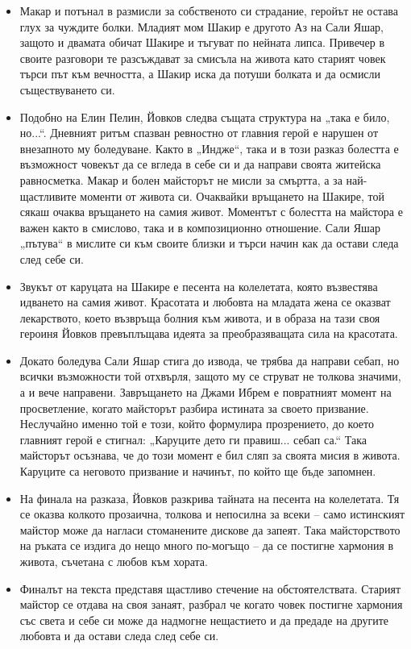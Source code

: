 \documentclass[12pt,a4paper]{article}
\begin{document}
\begin{itemize}[leftmargin=*, noitemsep, topsep=2pt, parsep=0pt]
    \vspace{0.1cm}
    \item Макар и потънал в размисли за собственото си страдание, геройът не остава глух за чуждите болки. Младият мом Шакир е другото Аз на Сали Яшар, защото и двамата обичат Шакире и тъгуват по нейната липса. Привечер в своите разговори те разсъждават за смисъла на живота като старият човек търси път към вечността, а Шакир иска да потуши болката и да осмисли съществуването си.
    \vspace{0.1cm}
    \item Подобно на Елин Пелин, Йовков следва същата структура на „така е било, но...“. Дневният ритъм спазван ревностно от главния герой е нарушен от внезапното му боледуване. Както в „Индже“, така и в този разказ болестта е възможност човекът да се вгледа в себе си и да направи своята житейска равносметка. Макар и болен майсторът не мисли за смъртта, а за най-щастливите моменти от живота си. Очаквайки връщането на Шакире, той сякаш очаква връщането на самия живот. Моментът с болестта на майстора е важен както в смислово, така и в композиционно отношение. Сали Яшар „пътува“ в мислите си към своите близки и търси начин как да остави следа след себе си.
    \vspace{0.1cm}
    \item Звукът от каруцата на Шакире е песента на колелетата, която възвестява идването на самия живот. Красотата и любовта на младата жена се оказват лекарството, което възвръща болния към живота, и в образа на тази своя героиня Йовков превъплъщава идеята за преобразяващата сила на красотата.
    \vspace{0.1cm}
    \item Докато боледува Сали Яшар стига до извода, че трябва да направи себап, но всички възможности той отхвърля, защото му се струват не толкова значими, а и вече направени. Завръщането на Джами Ибрем е повратният момент на просветление, когато майсторът разбира истината за своето призвание. Неслучайно именно той е този, който формулира прозрението, до което главният герой е стигнал: „Каруците дето ги правиш... себап са.“ Така майсторът осъзнава, че до този момент е бил сляп за своята мисия в живота. Каруците са неговото призвание и начинът, по който ще бъде запомнен.
    \vspace{0.1cm}
    \item На финала на разказа, Йовков разкрива тайната на песента на колелетата. Тя се оказва колкото прозаична, толкова и непосилна за всеки -- само истинският майстор може да нагласи стоманените дискове да запеят. Така майсторството на ръката се издига до нещо много по-могъщо -- да се постигне хармония в живота, съчетана с любов към хората.
    \vspace{0.1cm}
    \item Финалът на текста представя щастливо стечение на обстоятелствата. Старият майстор се отдава на своя занаят, разбрал че когато човек постигне хармония със света и себе си може да надмогне нещастието и да предаде на другите любовта и да остави следа след себе си.
\end{itemize}
\end{document}
